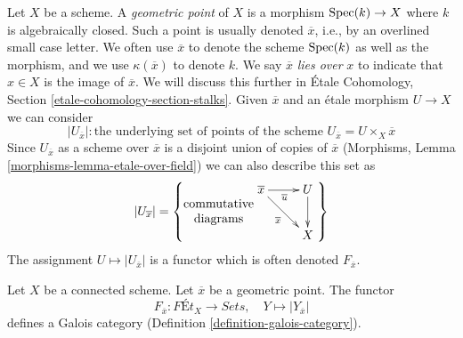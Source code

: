\noindent
Let $X$ be a scheme. A {\it geometric point} of $X$ is a morphism
$\mathop{\mathrm{Spec}}(k) \to X$ where $k$ is algebraically closed. Such a point is
usually denoted $\overline{x}$, i.e., by an overlined small case letter.
We often use $\overline{x}$ to denote the scheme $\mathop{\mathrm{Spec}}(k)$ as well as
the morphism, and we use $\kappa(\overline{x})$
to denote $k$. We say $\overline{x}$ {\it lies over} $x$
to indicate that $x \in X$ is the image of $\overline{x}$.
We will discuss this further in
\'Etale Cohomology, Section \ref{etale-cohomology-section-stalks}.
Given $\overline{x}$ and an \'etale morphism $U \to X$ we can
consider
$$
|U_{\overline{x}}| : \text{the underlying set of points of the
scheme }U_{\overline{x}} = U \times_X \overline{x}
$$
Since $U_{\overline{x}}$ as a scheme over $\overline{x}$
is a disjoint union of copies of $\overline{x}$
(Morphisms, Lemma \ref{morphisms-lemma-etale-over-field})
we can also describe this set as
$$
|U_{\overline{x}}| =
\left\{
\begin{matrix}
\text{commutative} \\
\text{diagrams}
\end{matrix}
\vcenter{
\xymatrix{
\overline{x} \ar[rd]_{\overline{x}} \ar[r]_{\overline{u}} & U \ar[d] \\
& X
}
}
\right\}
$$
The assignment $U \mapsto |U_{\overline{x}}|$ is a functor
which is often denoted $F_{\overline{x}}$.

\begin{lemma}
\label{lemma-finite-etale-connected-galois-category}
Let $X$ be a connected scheme. Let $\overline{x}$ be a geometric point.
The functor
$$
F_{\overline{x}} : \textit{F\'Et}_X \longrightarrow \textit{Sets},\quad
Y \longmapsto |Y_{\overline{x}}|
$$
defines a Galois category (Definition \ref{definition-galois-category}).
\end{lemma}

